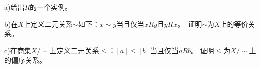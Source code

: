 \documentclass{beamer}
\begin{document}
\begin{CJK*}{UTF8}{gbsn}
\begin{frame}
\begin{Exercise}[P126-6]
    a)给出$R$的一个实例。

    b)在$X$上定义二元关系$\sim$如下：$x\sim y$当且仅当$x R y$且$y R x$。　证明$\sim$为$X$上的等价关系。

    c)在商集$X/\sim$上定义二元关系$\leq$：$[a]\leq [b]$当且仅当$aRb$。
    证明$\leq$为$X/\sim$上的偏序关系。
  \end{Exercise}
\end{frame}
\end{CJK*}
\end{document}
